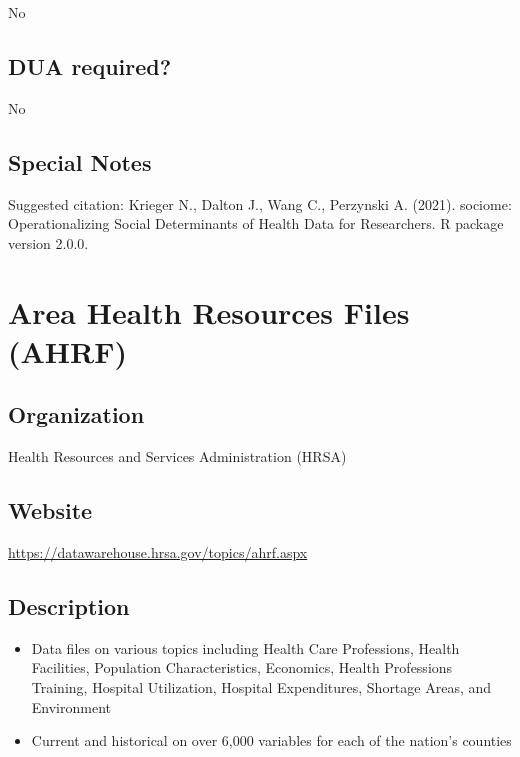 \documentclass[
]{book}
\providecommand{\tightlist}{%
  \setlength{\itemsep}{0pt}\setlength{\parskip}{0pt}}
\begin{document}
No

\hypertarget{dua-required-10}{%
\section{DUA required?}\label{dua-required-10}}

No

\hypertarget{special-notes-10}{%
\section{Special Notes}\label{special-notes-10}}

Suggested citation: Krieger N., Dalton J., Wang C., Perzynski A. (2021). sociome: Operationalizing Social Determinants of Health Data for Researchers. R package version 2.0.0.

\mainmatter

\hypertarget{area-health-resources-files-ahrf}{%
\chapter{Area Health Resources Files (AHRF)}\label{area-health-resources-files-ahrf}}

\hypertarget{organization-11}{%
\section{Organization}\label{organization-11}}

Health Resources and Services Administration (HRSA)

\hypertarget{website-11}{%
\section{Website}\label{website-11}}

\url{https://datawarehouse.hrsa.gov/topics/ahrf.aspx}

\hypertarget{description-11}{%
\section{Description}\label{description-11}}

\begin{itemize}
\tightlist
\item
  Data files on various topics including Health Care Professions, Health Facilities, Population Characteristics, Economics, Health Professions Training, Hospital Utilization, Hospital Expenditures, Shortage Areas, and Environment
\item
  Current and historical on over 6,000 variables for each of the nation's counties
\end{itemize}
\end{document}
